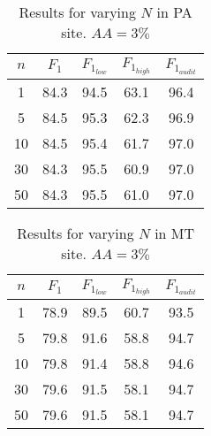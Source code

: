 \begin{table}[ht!]
\caption{Results for varying $N$ in PA site. $AA=3\%$} %
\centering
\begin{tabular}{c|c|ccc}
\hline
\textbf{$n$} & \textbf{$F_1$} & \textbf{$F_{1_{low}}$} & \textbf{$F_{1_{high}}$} & \textbf{$F_{1_{audit}}$} \\ \hline
1          & 84.3        & 94.5                 & 63.1                  & 96.4                     \\
5          & 84.5        & 95.3                 & 62.3                  & 96.9                     \\
10          & 84.5        & 95.4                 & 61.7                  & 97.0                     \\
30          & 84.3        & 95.5                 & 60.9                  & 97.0                     \\
50          & 84.3        & 95.5                 & 61.0                  & 97.0                     \\ \hline

\end{tabular}
\label{tab:PA_inference_runs}
\end{table}


\begin{table}[ht!]
\caption{Results for varying $N$ in MT site. $AA=3\%$} %
\centering
\begin{tabular}{c|c|ccc}
\hline
\textbf{$n$} & \textbf{$F_1$} & \textbf{$F_{1_{low}}$} & \textbf{$F_{1_{high}}$} & \textbf{$F_{1_{audit}}$} \\ \hline
1          & 78.9        & 89.5                 & 60.7                  & 93.5                     \\
5          & 79.8        & 91.6                 & 58.8                  & 94.7                     \\
10          & 79.8        & 91.4                 & 58.8                  & 94.6                     \\
30          & 79.6        & 91.5                 & 58.1                  & 94.7                     \\
50          & 79.6        & 91.5                 & 58.1                  & 94.7                     \\ \hline

\end{tabular}
\label{tab:MT_inference_runs}
\end{table}
\fi
\iffalse
